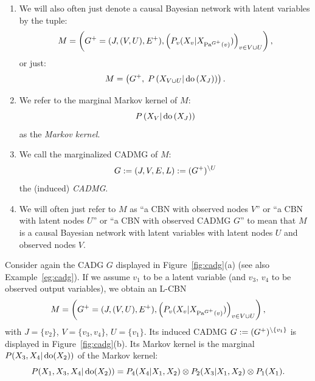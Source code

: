 \begin{Not}
    \begin{enumerate}
        \item   We will also often just denote a causal Bayesian network with latent variables by the tuple:
            \[ M= \left ( G^+=(J,(V,U),E^+), \left ( P_v(X_v|X_{\mathrm{Pa}^{G^+}(v)})\right )_{v \in V \cup U}\right ),  \]
or just:
\[ M = \left ( G^+, \; P\left ( X_{V \cup U}| \operatorname{do}\left ( X_J \right )\right ) \right ).\]
    \item     We refer to the marginal Markov kernel of $M$:
    \[  P\left ( X_V| \operatorname{do}\left ( X_J \right )\right )  \]
    as the \emph{\observational Markov kernel}. 
    \item     We call the marginalized CADMG of $M$:
    \[ G := (J,V,E,L) := (G^+)^{\setminus U}  \]
    the (induced) \emph{\observational CADMG}.
\item     We will often just refer to $M$ as ``a CBN with observed nodes $V$'' or ``a CBN with latent nodes $U$'' or 
   ``a CBN with observed CADMG $G$'' to mean that $M$ is a causal Bayesian network with latent variables with latent nodes $U$ and observed nodes $V$.
    \end{enumerate}
\end{Not}

\begin{Eg}
  Consider again the CADG $G$ displayed in Figure~\ref{fig:cadg}(a) (see also Example~\ref{eg:cadg}).
  If we assume $v_1$ to be a latent variable (and $v_3$, $v_4$ to be observed output variables),
  we obtain an L-CBN 
    \[ M= \left ( G^+=(J,(V,U),E^+), \left ( P_v(X_v|X_{\mathrm{Pa}^{G^+}(v)})\right )_{v \in V \cup U}\right ),  \]
  with $J = \{v_2\}$, $V = \{v_3,v_4\}$, $U = \{v_1\}$. Its induced \observational CADMG $G := (G^+)^{\setminus \{v_1\}}$ 
  is displayed in Figure~\ref{fig:cadg}(b). Its \observational Markov kernel is
  the marginal $P(X_3,X_4|\operatorname{do}(X_2))$ of the Markov kernel:
  \[  P(X_1,X_3,X_4|\operatorname{do}(X_2)) = P_4(X_4|X_1,X_2) \otimes P_2(X_3|X_1,X_2) \otimes P_1(X_1). \]
\end{Eg}

